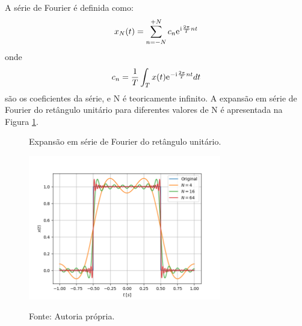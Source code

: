 \documentclass[12pt,a4paper]{report}
\newcommand{\I}{{\mathrm{i}\mkern1mu}}
\newcommand{\euler}{{\mathrm{e}\mkern1mu}}
\begin{document}
  A série de Fourier é definida como:
  \begin{equation}
    x_N(t) = \sum_{n = -N}^{+N} c_n \euler^{\I \frac{2 \pi}{T} n t}
  \end{equation}
  onde
  \begin{equation}
    c_n = \frac{1}{T} \int_T x(t) \euler^{-\I \frac{2 \pi}{T} n t} dt
  \end{equation}
  são os coeficientes da série, e N é teoricamente infinito. A expansão em série de Fourier do retângulo unitário
  para diferentes valores de N é apresentada na Figura \ref{fig:fourier}.
  \begin{figure}[H]
    \caption{Expansão em série de Fourier do retângulo unitário.}
    \centering
    \includegraphics[width=0.75\textwidth]{fourier_series}
    \label{fig:fourier}
    \caption*{Fonte: Autoria própria.}
  \end{figure}
\end{document}
